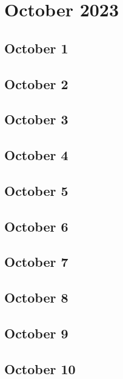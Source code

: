 %
%
%

\chapter{October 2023}
\label{intro} %

\section{October 1}

\section{October 2}

\section{October 3}

\section{October 4}

\section{October 5}

\section{October 6}

\section{October 7}

\section{October 8}

\section{October 9}

\section{October 10}

